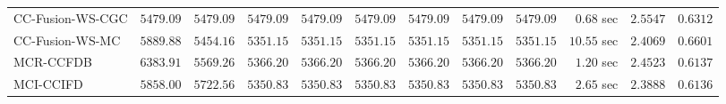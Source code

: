 \begin{table}[H]
\begin{tabular}{lrrrrrrrrrrr}
    CC-Fusion-WS-CGC & $      5479.09$ & $      5479.09$ & $      5479.09$ & $      5479.09$ & $      5479.09$ & $      5479.09$ & $      5479.09$ & $      5479.09$ & $         0.68$ sec    & $       2.5547$  & $       0.6312$ \\ 
     CC-Fusion-WS-MC & $      5889.88$ & $      5454.16$ & $      5351.15$ & $      5351.15$ & $      5351.15$ & $      5351.15$ & $      5351.15$ & $      5351.15$ & $        10.55$ sec    & $       2.4069$  & $       0.6601$ \\ 
\cmidrule{1-1} 
           MCR-CCFDB & $      6383.91$ & $      5569.26$ & $      5366.20$ & $      5366.20$ & $      5366.20$ & $      5366.20$ & $      5366.20$ & $      5366.20$ & $         1.20$ sec    & $       2.4523$  & $       0.6137$ \\ 
\cmidrule{1-1} 
           MCI-CCIFD & $      5858.00$ & $      5722.56$ & $      5350.83$ & $      5350.83$ & $      5350.83$ & $      5350.83$ & $      5350.83$ & $      5350.83$ & $         2.65$ sec    & $       2.3888$  & $       0.6136$ \\ 
\bottomrule
\end{tabular}
\end{table}

